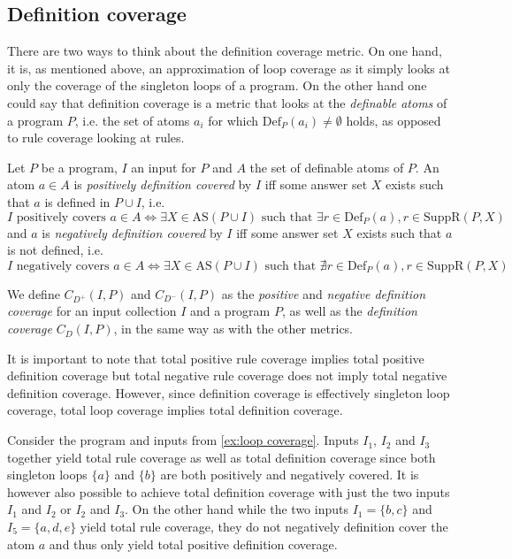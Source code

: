 \subsection{Definition coverage}
\label{subsec:Coverage metrics/Branch-like coverage/Definition coverage}
There are two ways to think about the definition coverage metric. On one hand, it is, as mentioned above, an approximation of loop coverage as it simply looks at only the coverage of the singleton loops of a program. On the other hand one could say that definition coverage is a metric that looks at the \emph{definable atoms} of a program $P$, i.e. the set of atoms $a_i$ for which \(\text{Def}_P(a_i) \neq \emptyset\) holds, as opposed to rule coverage looking at rules.

\begin{definition}
    Let $P$ be a program, $I$ an input for $P$ and $A$ the set of definable atoms of $P$. An atom \(a \in A\) is \emph{positively definition covered} by $I$ iff some answer set $X$ exists such that $a$ is defined in \(P \cup I\), i.e.
    \[
        I \text{ positively covers } a \in A \Longleftrightarrow \exists X \in \text{AS}(P \cup I) \text{ such that } \exists r \in \text{Def}_P(a), r \in \text{SuppR}(P, X)
    \]
    and $a$ is \emph{negatively definition covered} by $I$ iff some answer set $X$ exists such that $a$ is not defined, i.e.
    \[
        I \text{ negatively covers } a \in A \Longleftrightarrow \exists X \in \text{AS}(P \cup I) \text{ such that } \nexists r \in \text{Def}_P(a), r \in \text{SuppR}(P, X)
    \]
\end{definition}

We define \(C_{D^+}(I, P)\) and \(C_{D^-}(I, P)\) as the \emph{positive} and \emph{negative definition coverage} for an input collection $I$ and a program $P$, as well as the \emph{definition coverage} \(C_D(I, P)\), in the same way as with the other metrics.

It is important to note that total positive rule coverage implies total positive definition coverage but total negative rule coverage does not imply total negative definition coverage. However, since definition coverage is effectively singleton loop coverage, total loop coverage implies total definition coverage.

\begin{example}
    Consider the program and inputs from \cref{ex:loop coverage}. Inputs $I_1$, $I_2$ and $I_3$ together yield total rule coverage as well as total definition coverage since both singleton loops \(\{a\}\) and \(\{b\}\) are both positively and negatively covered. It is however also possible to achieve total definition coverage with just the two inputs $I_1$ and $I_2$ or $I_2$ and $I_3$. On the other hand while the two inputs \(I_1 = \{b, c\}\) and \(I_5 = \{a, d, e\}\) yield total rule coverage, they do not negatively definition cover the atom $a$ and thus only yield total positive definition coverage.
\end{example}

